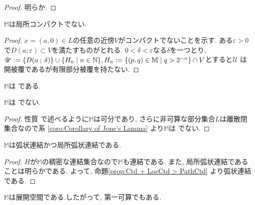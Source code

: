 \documentclass[uplatex, dvipdfmx, a4paper, 12pt, class=jsbook, crop=false]{standalone}
\begin{document}
\begin{proof}
	明らか.
\end{proof}

\begin{property}
	$ \mathbb{M} $は局所コンパクトでない.
\end{property}

\begin{proof}
	$ x = (a, 0) \in L $の任意の近傍$ V $がコンパクトでないことを示す. ある$ \varepsilon > 0 $で$ D(a \semicolon \varepsilon) \subset V $を満たすものがとれる. $ 0 < \delta < \varepsilon $なる$ \delta $を一つとり, $ \mathscr{U} \defeq 
	\{D(a \semicolon \delta)\} \cup \setcomp{H_n}{n \in \N}, H_n \defeq \setcomp{(p, q) \in \mathbb{M}}{q > 2^{-n}} \cap V $とすると$ \mathscr{U} $
	は開被覆であるが有限部分被覆を持たない. 
\end{proof}




\begin{property}
	$ \mathbb{M} $は  である.
\end{property}

\begin{property}
	$ \mathbb{M} $は  でない.
\end{property}

\begin{proof}
	性質  で述べるように$ \mathbb{M} $は可分であり, さらに非可算な部分集合$ L $は離散閉集合なので系 \ref{coro:Corollary of Jone's Lamma} より$ \mathbb{M} $は  でない.
\end{proof}

\begin{property}
	$ \mathbb{M} $は弧状連結かつ局所弧状連結である.
\end{property}

\begin{proof}
	$ H $が$ \mathbb{M} $の稠密な連結集合なので$ \mathbb{M} $も連結である. また, 局所弧状連結であることは明らかである. よって, 命題\ref{prop:Ctd + LocCtd > PathCtd} より弧状連結である.
\end{proof}

\begin{property}
	$ \mathbb{M} $は展開空間である.したがって, 第一可算でもある.
\end{property}
\end{document}
